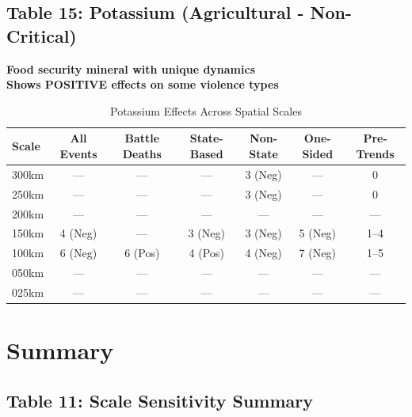 \documentclass[11pt]{article}
\begin{document}
\clearpage

\subsection{Table 15: Potassium (Agricultural - Non-Critical)}

\textbf{Food security mineral with unique dynamics}\\
\textbf{Shows POSITIVE effects on some violence types}

\begin{table}[H]
\centering
\caption{Potassium Effects Across Spatial Scales}
\begin{tabular}{lcccccc}
\toprule
Scale & All Events & Battle Deaths & State-Based & Non-State & One-Sided & Pre-Trends \\
\midrule
300km & ---       & ---           & ---         & 3 (Neg)   & ---       & 0          \\
250km & ---       & ---           & ---         & 3 (Neg)   & ---       & 0          \\
200km & ---       & ---           & ---         & ---       & ---       & ---        \\
150km & 4 (Neg)   & ---           & 3 (Neg)     & 3 (Neg)   & 5 (Neg)   & 1--4       \\
100km & 6 (Neg)   & 6 (Pos)       & 4 (Pos)     & 4 (Neg)   & 7 (Neg)   & 1--5       \\
050km & ---       & ---           & ---         & ---       & ---       & ---        \\
025km & ---       & ---           & ---         & ---       & ---       & ---        \\
\bottomrule
\end{tabular}
\end{table}

\clearpage

\section{Summary}

\subsection{Table 11: Scale Sensitivity Summary}
\end{document}
